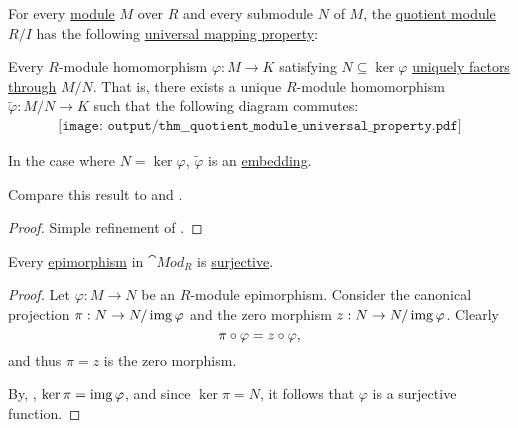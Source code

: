 \begin{theorem}\label{thm:quotient_module_universal_property}
  For every \hyperref[def:module]{module} \( M \) over \( R \) and every submodule \( N \) of \( M \), the \hyperref[def:module/quotient]{quotient module} \( R / I \) has the following \hyperref[rem:universal_mapping_property]{universal mapping property}:
  \begin{displayquote}
    Every \( R \)-module homomorphism \( \varphi: M \to K \) satisfying \( N \subseteq \ker \varphi \) \hyperref[def:factors_through]{uniquely factors through} \( M / N \). That is, there exists a unique \( R \)-module homomorphism \( \widetilde{\varphi}: M / N \to K \) such that the following diagram commutes:
    \begin{equation}\label{eq:thm:quotient_module_universal_property/diagram}
      \begin{aligned}
        \texttt{[image: output/thm\_\_quotient\_module\_universal\_property.pdf]}
      \end{aligned}
    \end{equation}

    In the case where \( N = \ker \varphi \), \( \widetilde{\varphi} \) is an \hyperref[def:first_order_homomorphism_invertibility/embedding]{embedding}.
  \end{displayquote}

  Compare this result to  and .
\end{theorem}
\begin{proof}
  Simple refinement of .
\end{proof}

\begin{proposition}\label{thm:module_epimorphisms_are_surjective}
  Every \hyperref[def:morphism_invertibility/right_cancellative]{epimorphism} in \hyperref[def:group/category]{\( \cat{Mod}_R \)} is \hyperref[def:function_invertibility/surjective]{surjective}.
\end{proposition}
\begin{proof}
  Let \( \varphi: M \to N \) be an \( R \)-module epimorphism. Consider the canonical projection \( \pi: N \to N / \operatorname{img} \varphi \) and the zero morphism \( z: N \to N / \operatorname{img} \varphi \). Clearly
  \begin{equation*}
    \pi \bincirc \varphi = z \bincirc \varphi,
  \end{equation*}
  and thus \( \pi = z \) is the zero morphism.

  By, , \( \ker \pi = \operatorname{img} \varphi \), and since \( \ker \pi = N \), it follows that \( \varphi \) is a surjective function.
\end{proof}


